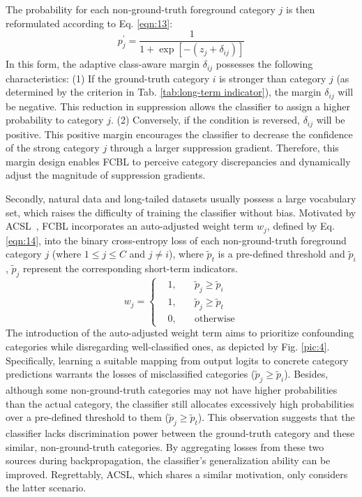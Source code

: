 \documentclass[lettersize,journal]{IEEEtran}
\begin{document}
The probability for each non-ground-truth foreground category $j$ is then reformulated according to Eq. \eqref{eqn:13}:
\begin{equation}\label{eqn:13}
    p_{j}^{\prime} = \frac{1}{1+\exp[-(z_j+\delta_{ij})]}
\end{equation}
In this form, the adaptive class-aware margin $\delta_{ij}$ possesses the following characteristics:
(1) If the ground-truth category $i$ is stronger than category $j$ (as determined by the criterion in Tab. \ref{tab:long-term indicator}), the margin $\delta_{ij}$ will be negative.
This reduction in suppression allows the classifier to assign a higher probability to category $j$.
(2) Conversely, if the condition is reversed, $\delta_{ij}$ will be positive. 
This positive margin encourages the classifier to decrease the confidence of the strong category $j$ through a larger suppression gradient.
Therefore, this margin design enables FCBL to perceive category discrepancies and dynamically adjust the magnitude of suppression gradients.

Secondly, natural data and long-tailed datasets usually possess a large vocabulary set, which raises the difficulty of training the classifier without bias.
Motivated by ACSL~\cite{wang2021adaptive}, FCBL incorporates an auto-adjusted weight term $w_j$, defined by Eq. \eqref{eqn:14}, into the binary cross-entropy loss of each non-ground-truth foreground category $j$ (where $1\le j \le C$ and $j\neq i$), where $\tilde{p}_{t}$ is a pre-defined threshold and $\tilde{p}_{i}$, $\tilde{p}_{j}$ represent the corresponding short-term indicators.
\begin{equation}\label{eqn:14}
    w_{j}=\left\{
        \begin{aligned}
            & 1, \quad & \tilde{p}_{j}\geq \tilde{p}_{i} \\
            & 1, \quad & \tilde{p}_{j}\geq \tilde{p}_{t} \\
            & 0, \quad & \text{otherwise}
        \end{aligned}
    \right.
\end{equation}
The introduction of the auto-adjusted weight term aims to prioritize confounding categories while disregarding well-classified ones, as depicted by Fig. \ref{pic:4}.
Specifically, learning a suitable mapping from output logits to concrete category predictions warrants the losses of misclassified categories ($\tilde{p}_{j}\geq \tilde{p}_{i}$).
Besides, although some non-ground-truth categories may not have higher probabilities than the actual category, the classifier still allocates excessively high probabilities over a pre-defined threshold to them ($\tilde{p}_{j}\geq \tilde{p}_{t}$).
This observation suggests that the classifier lacks discrimination power between the ground-truth category and these similar, non-ground-truth categories.
By aggregating losses from these two sources during backpropagation, the classifier's generalization ability can be improved.
Regrettably, ACSL, which shares a similar motivation, only considers the latter scenario.
\end{document}
